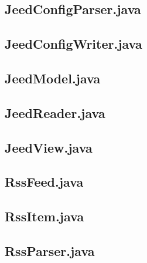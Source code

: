 \documentclass[a4paper, 12pt]{article}
\begin{document}
\newpage
\subsection{JeedConfigParser.java}\label{JeedConfigParser.java}
\begin{footnotesize}
  
\end{footnotesize}

\newpage
\subsection{JeedConfigWriter.java}\label{JeedConfigWriter.java}
\begin{footnotesize}
  
\end{footnotesize}

\newpage
\subsection{JeedModel.java}\label{JeedModel.java}
\begin{footnotesize}
  
\end{footnotesize}

\newpage
\subsection{JeedReader.java}\label{JeedReader.java}
\begin{footnotesize}
  
\end{footnotesize}

\newpage
\subsection{JeedView.java}\label{JeedView.java}
\begin{footnotesize}
  
\end{footnotesize}

\newpage
\subsection{RssFeed.java}\label{RssFeed.java}
\begin{footnotesize}
  
\end{footnotesize}

\newpage
\subsection{RssItem.java}\label{RssItem.java}
\begin{footnotesize}
  
\end{footnotesize}

\newpage
\subsection{RssParser.java}\label{RssParser.java}
\begin{footnotesize}
  
\end{footnotesize}
  
\end{document}
